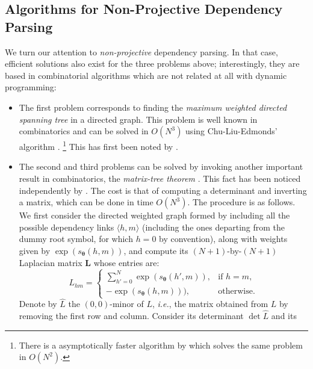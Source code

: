 \subsection{Algorithms for Non-Projective Dependency Parsing}

We turn our attention to \emph{non-projective} dependency parsing. In that case, efficient solutions also exist for the three problems above; 
interestingly, they are based in combinatorial algorithms which are not related at all with dynamic programming: 
\begin{itemize}
\item The first problem corresponds to finding the \emph{maximum weighted directed spanning tree} in a directed graph. 
This problem is well known in combinatorics and can be solved in $O(N^3)$ using Chu-Liu-Edmonds' algorithm 
\citep{Chu1965,Edmonds1967}.%
\footnote{There is a asymptotically faster algorithm by \citet{Tarjan1977} which solves the same problem in $O(N^2)$.} %
This has first been noted by \citet{McDonald2005b}. 
\item The second and third problems can be solved by invoking another important result in combinatorics, the 
\emph{matrix-tree theorem} \citep{Tutte1984}. This fact has been noticed independently by 
\citet{DSmithSmith2007,Koo2007,McDonald2007}. The cost is that of computing a determinant and inverting a matrix, 
which can be done in time $O(N^3)$. 
The procedure is as follows. 
We first consider the directed weighted graph formed by including all 
the possible dependency links $\langle h,m \rangle$ (including the ones departing from the dummy root symbol, 
for which $h = 0$ by convention), along with weights 
given by $\exp(s_{\boldsymbol{\theta}}(h,m))$, 
and compute its 
$(N+1)$-by-$(N+1)$ Laplacian matrix $\boldsymbol{L}$ whose entries are:
\begin{equation}
L_{hm} = \left\{ 
\begin{array}{ll}
\sum_{h'=0}^N\exp(s_{\boldsymbol{\theta}}(h',m)), & \text{if $h=m$,} \\
-\exp(s_{\boldsymbol{\theta}}(h,m))), & \text{otherwise.}
\end{array}\right.
\end{equation}
Denote by $\hat{L}$ the $(0,0)$-minor of $L$, 
\emph{i.e.}, the matrix obtained from $L$ 
by removing the first row and column. Consider its determinant $\det \hat{L}$ and its 

\end{itemize}

